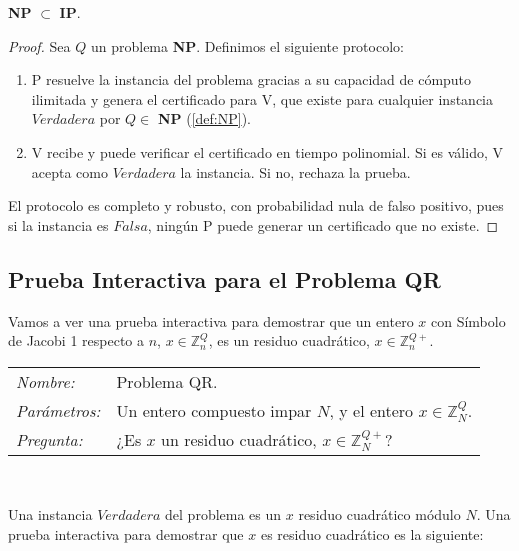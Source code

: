 \begin{proposition}
	\textbf{NP} $\subset$ \textbf{IP}.
\end{proposition}

\begin{proof}
	Sea $Q$ un problema \textbf{NP}. Definimos el siguiente protocolo:

	\begin{enumerate}
		\item  P resuelve la instancia del problema gracias a su capacidad de cómputo ilimitada y genera el certificado para V, que existe para cualquier instancia $Verdadera$ por $Q\in$ \textbf{NP} (\ref{def:NP}).
		\item  V recibe y puede verificar el certificado en tiempo polinomial. Si es válido, V acepta como $Verdadera$ la instancia. Si no, rechaza la prueba.
	\end{enumerate}

	El protocolo es completo y robusto, con probabilidad nula de falso positivo, pues si la instancia es $Falsa$, ningún P puede generar un certificado que no existe.

\end{proof}



\subsection{Prueba Interactiva para el Problema QR}

Vamos a ver una prueba interactiva para demostrar que un entero $x$ con Símbolo de Jacobi 1 respecto a $n$, $x \in \mathbb{Z}^Q_n$, es un residuo cuadrático, $x \in \mathbb{Z}^{Q+}_n$.

\hfil

\begin{tabular}{|ll}
	\textit{Nombre:} & Problema QR. \\
	\textit{Parámetros:} &Un entero compuesto impar $N$, y el entero $x\in \mathbb{Z}^Q_N$. \\
	\textit{Pregunta:} & ¿Es $x$ un residuo cuadrático, $x \in \mathbb{Z}^{Q+}_N$? \\
\end{tabular}
\\

\hfil

Una instancia $Verdadera$ del problema es un $x$ residuo cuadrático módulo $N$. Una prueba interactiva para demostrar que $x$ es residuo cuadrático es la siguiente:

